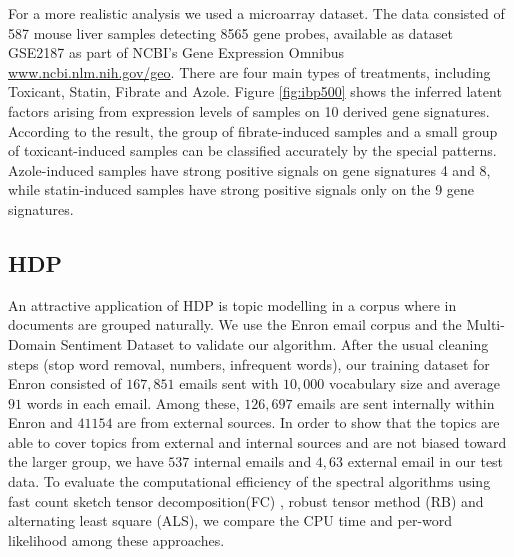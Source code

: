 \documentclass[twoside,11pt]{article}
\begin{document}
{For a more realistic analysis we used a microarray dataset. The data
consisted of 587 mouse liver samples detecting 8565 gene probes,
available as dataset GSE2187 as part of NCBI's Gene Expression Omnibus
\url{www.ncbi.nlm.nih.gov/geo}. There are four main types of
treatments, including Toxicant, Statin, Fibrate and Azole. Figure
\ref{fig:ibp500} shows the inferred latent factors arising from
expression levels of samples on 10 derived gene signatures. According
to the result, the group of fibrate-induced samples and a small group
of toxicant-induced samples can be classified accurately by the
special patterns. Azole-induced samples have strong positive signals
on gene signatures 4 and 8, while statin-induced samples
have strong positive signals only on the 9 gene signatures.






\subsection{HDP}
\label{sec:exp}

An attractive application of HDP is topic modelling in a corpus
where in documents are grouped naturally. We use the Enron email corpus \citep{KliYan04} and the Multi-Domain Sentiment Dataset \citep{BliDrePer07} to validate our algorithm. After the usual cleaning steps (stop word removal, numbers, infrequent
words), our training dataset for Enron consisted of $167,851$ emails sent with $10,000$ vocabulary size and average $91$ words in each email. Among these, $126,697$ emails are sent internally within Enron 
and $41154$ are from external sources. In order to show that the topics are able to cover topics from external and internal sources and are not biased toward the larger group, we have $537$ internal emails and $4,63$ external email in our test data. To evaluate the computational efficiency of the spectral algorithms
using fast count sketch tensor decomposition(FC) \citep{WanTunSmoAna15}, robust tensor method (RB) and alternating least square
(ALS), we compare the CPU time and per-word likelihood among these approaches.




}
\end{document}
